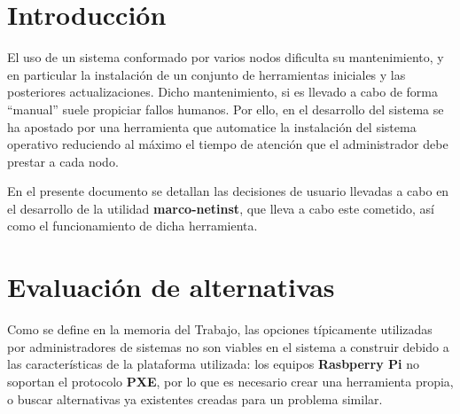 \documentclass{article}
\title{\hmwkTitle}
\author{\textbf{\hmwkAuthorName}}
\date{\hmwkDueDate}
\begin{document}
\maketitle
\begin{abstract}
Marcobootstrap comprende un conjunto de utilidades que permite llevar a cabo la descarga e instalación de un sistema operativo en varios nodos sin requerir la supervisión de un administrador, incluyendo el autodescubrimiento del servidor que aloja los ficheros binarios. 
\end{abstract}

\setcounter{tocdepth}{1}

\tableofcontents
\newpage

\section{Introducción}

El uso de un sistema conformado por varios nodos dificulta su mantenimiento, y en particular la instalación de un conjunto de herramientas iniciales y las posteriores actualizaciones. Dicho mantenimiento, si es llevado a cabo de forma ``manual'' suele propiciar fallos humanos. Por ello, en el desarrollo del sistema se ha apostado por una herramienta que automatice la instalación del sistema operativo reduciendo al máximo el tiempo de atención que el administrador debe prestar a cada nodo.

En el presente documento se detallan las decisiones de usuario llevadas a cabo en el desarrollo de la utilidad \textbf{marco-netinst}, que lleva a cabo este cometido, así como el funcionamiento de dicha herramienta.

\section{Evaluación de alternativas}

Como se define en la memoria del Trabajo, las opciones típicamente utilizadas por administradores de sistemas no son viables en el sistema a construir debido a las características de la plataforma utilizada: los equipos \textbf{Rasbperry Pi} no soportan el protocolo \textbf{PXE}, por lo que es necesario crear una herramienta propia, o buscar alternativas ya existentes creadas para un problema similar.
\end{document}
